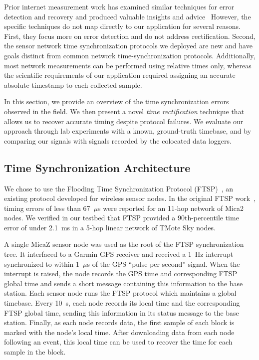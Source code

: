 Prior internet measurement work has examined similar techniques for error
detection and recovery and produced valuable insights and
advice~\cite{paxson98calibrating,1028824} However, the specific techniques do
not map directly to our application for several reasons. First, they focus
more on error detection and do not address rectification. Second, the sensor
network time synchronization protocols we deployed are new and have goals
distinct from common network time-synchronization protocols. Additionally,
most network measurements can be performed using relative times only, whereas
the scientific requirements of our application required assigning an accurate
absolute timestamp to each collected sample.

In this section, we provide an overview of the time synchronization errors
observed in the field. We then present a novel \textit{time rectification}
technique that allows us to recover accurate timing despite protocol
failures. We evaluate our approach through lab experiments with a known,
ground-truth timebase, and by comparing our signals with signals recorded by
the colocated data loggers.

\subsection{Time Synchronization Architecture}

We chose to use the Flooding Time Synchronization Protocol
(FTSP)~\cite{ftsp}, an existing protocol developed for wireless sensor nodes.
In the original FTSP work~\cite{ftsp}, timing errors of less than 67~$\mu$s
were reported for an 11-hop network of Mica2 nodes. We verified in our
testbed that FTSP provided a 90th-percentile time error of under 2.1~ms in a
5-hop linear network of TMote Sky nodes.

A single MicaZ sensor node was used as the root of the FTSP synchronization
tree. It interfaced to a Garmin GPS receiver and received a 1~Hz interrupt
synchronized to within 1~$\mu$s of the GPS ``pulse per second'' signal.
When the interrupt is raised, the node records the GPS time and corresponding
FTSP global time and sends a short message containing this information to the
base station. Each sensor node runs the FTSP protocol which maintains a
global timebase. Every 10~s, each node records its local time and the
corresponding FTSP global time, sending this information in its status
message to the base station. Finally, as each node records data, the first
sample of each block is marked with the node's local time. After downloading
data from each node following an event, this local time can be used to
recover the time for each sample in the block.

